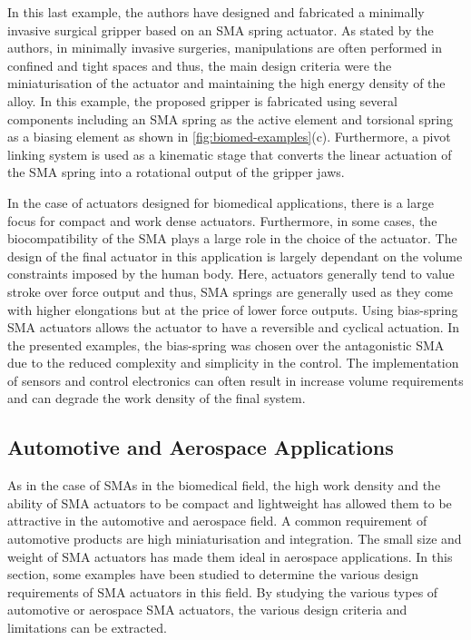 In this last example, the authors have designed and fabricated a minimally invasive surgical gripper based on an SMA spring actuator. As stated by the authors, in minimally invasive surgeries, manipulations are often performed in confined and tight spaces and thus, the main design criteria were the miniaturisation of the actuator and maintaining the high energy density of the alloy. In this example, the proposed gripper is fabricated using several components including an SMA spring as the active element and torsional spring as a biasing element as shown in \cref{fig:biomed-examples}(c). Furthermore, a pivot linking system is used as a kinematic stage that converts the linear actuation of the SMA spring into a rotational output of the gripper jaws.

In the case of actuators designed for biomedical applications, there is a large focus for compact and work dense actuators. Furthermore, in some cases, the biocompatibility of the SMA plays a large role in the choice of the actuator. The design of the final actuator in this application is largely dependant on the volume constraints imposed by the human body. Here, actuators generally tend to value stroke over force output and thus, SMA springs are generally used as they come with higher elongations but at the price of lower force outputs. Using bias-spring SMA actuators allows the actuator to have a reversible and cyclical actuation. In the presented examples, the bias-spring was chosen over the antagonistic SMA due to the reduced complexity and simplicity in the control. The implementation of sensors and control electronics can often result in increase volume requirements and can degrade the work density of the final system.

\subsection{Automotive and Aerospace Applications}
As in the case of SMAs in the biomedical field, the high work density and the ability of SMA actuators to be compact and lightweight has allowed them to be attractive in the automotive and aerospace field. A common requirement of automotive products are high miniaturisation and integration. The small size and weight of SMA actuators has made them ideal in aerospace applications. In this section, some examples have been studied to determine the various design requirements of SMA actuators in this field. By studying the various types of automotive or aerospace SMA actuators, the various design criteria and limitations can be extracted.

